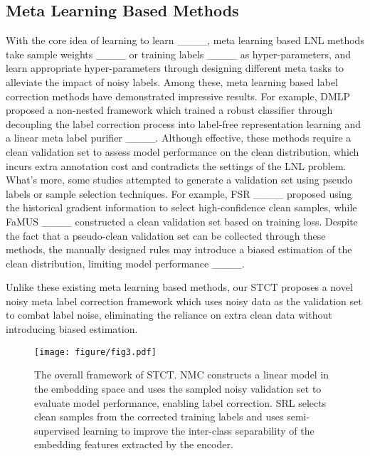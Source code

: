 \subsection{Meta Learning Based Methods}
With the core idea of learning to learn ____, meta learning based LNL methods take sample weights ____ or training labels ____ as hyper-parameters, and learn appropriate hyper-parameters through designing different meta tasks to alleviate the impact of noisy labels. Among these, meta learning based label correction methods have demonstrated impressive results. For example, DMLP proposed a non-nested framework which trained a robust classifier through decoupling the label correction process into label-free representation learning and a linear meta label purifier ____. Although effective, these methods require a clean validation set to assess model performance on the clean distribution, which incurs extra annotation cost and contradicts the settings of the LNL problem. What's more, some studies attempted to generate a validation set using pseudo labels or sample selection techniques. For example, FSR ____ proposed using the historical gradient information to select high-confidence clean samples, while FaMUS ____ constructed a clean validation set based on training loss. Despite the fact that a pseudo-clean validation set can be collected through these methods, the manually designed rules may introduce a biased estimation of the clean distribution, limiting model performance ____.

Unlike these existing meta learning based methods, our STCT proposes a novel noisy meta label correction framework which uses noisy data as the validation set to combat label noise, eliminating the reliance on extra clean data without introducing biased estimation.

\begin{figure*}[]
    \centering
    \texttt{[image: figure/fig3.pdf]}
    \caption{The overall framework of STCT. NMC constructs a linear model in the embedding space and uses the sampled noisy validation set to evaluate model performance, enabling label correction. SRL selects clean samples from the corrected training labels and uses semi-supervised learning to improve the inter-class separability of the embedding features extracted by the encoder.}
    \label{fig:diagram_method}
\end{figure*}